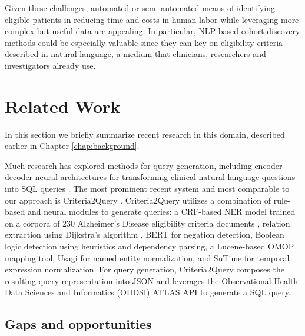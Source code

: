 \documentclass[../main.tex]{subfiles}
\begin{document}
Given these challenges, automated or semi-automated means of identifying eligible patients in reducing time and costs in human labor while leveraging more complex but useful data are appealing. In particular, NLP-based cohort discovery methods could be especially valuable since they can key on eligibility criteria described in natural language, a medium that clinicians, researchers and investigators already use.

\section{Related Work}

In this section we briefly summarize recent research in this domain, described earlier in Chapter \ref{chap:background}. 

Much research has explored methods for query generation, including encoder-decoder neural architectures for transforming clinical natural language questions into SQL queries \cite{bae2021question, park2021knowledge, wang2020text, pan2021bert, dhayne2021emr2vec}. The most prominent recent system and most comparable to our approach is Criteria2Query \cite{yuan2019criteria2query, fang2022combining}. Criteria2Query utilizes a combination of rule-based and neural modules to generate queries: a CRF-based NER model trained on a corpora of 230 Alzheimer's Disease eligibility criteria documents \cite{kang2017eliie}, relation extraction using Dijkstra’s algorithm \cite{chen2003dijkstra}, BERT \cite{devlin2018bert} for negation detection, Boolean logic detection using heuristics and dependency parsing, a Lucene-based \cite{lucene} OMOP mapping tool, Usagi \cite{usagi} for named entity normalization, and SuTime \cite{chang2012sutime} for temporal expression normalization. For query generation, Criteria2Query composes the resulting query representation into JSON and leverages the Observational Health Data Sciences and Informatics (OHDSI) ATLAS \cite{atlas} API to generate a SQL query.
    
\subsection{Gaps and opportunities}
\end{document}
